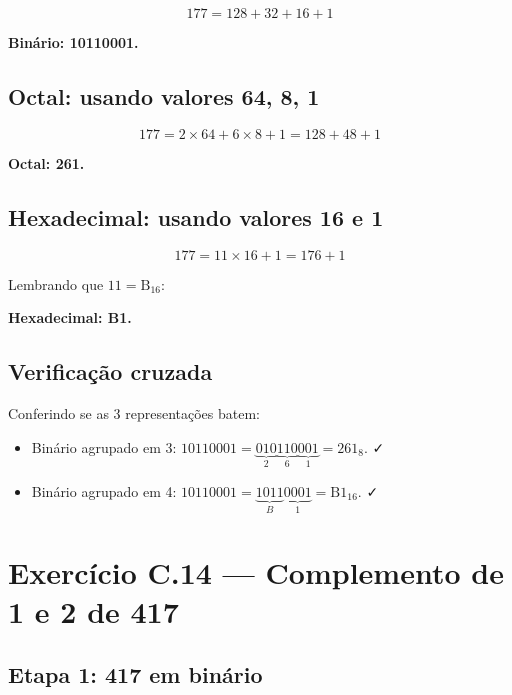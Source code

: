 \documentclass[11pt,a4paper]{article}
\begin{document}
\[
177 = 128 + 32 + 16 + 1
\]

\begin{resposta}\textbf{Bin\'ario: 10110001.}\end{resposta}

\subsection*{Octal: usando valores 64, 8, 1}

\[
177 = 2 \times 64 + 6 \times 8 + 1 = 128 + 48 + 1
\]

\begin{resposta}\textbf{Octal: 261.}\end{resposta}

\subsection*{Hexadecimal: usando valores 16 e 1}

\[
177 = 11 \times 16 + 1 = 176 + 1
\]

Lembrando que $11 = \text{B}_{16}$:

\begin{resposta}\textbf{Hexadecimal: B1.}\end{resposta}

\subsection*{Verifica\c{c}\~ao cruzada}

Conferindo se as 3 representa\c{c}\~oes batem:

\begin{itemize}[leftmargin=*,itemsep=0pt]
  \item Bin\'ario agrupado em 3: $10110001 = \underbrace{010}_{2}\underbrace{110}_{6}\underbrace{001}_{1} = 261_8$. ✓
  \item Bin\'ario agrupado em 4: $10110001 = \underbrace{1011}_{B}\underbrace{0001}_{1} = \text{B1}_{16}$. ✓
\end{itemize}

\newpage
\section{Exerc\'icio C.14 --- Complemento de 1 e 2 de 417}

\subsection*{Etapa 1: 417 em bin\'ario}
\end{document}
